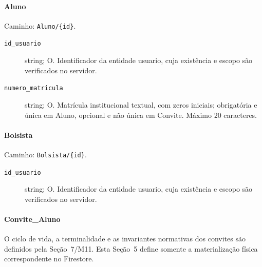 \paragraph{Aluno}\mbox{}\par
Caminho: \texttt{Aluno/\{id\}}.
\begin{description}
\item[\texttt{id\_usuario}] string; O. Identificador da entidade usuario, cuja existência e escopo são verificados no servidor.
\item[\texttt{numero\_matricula}] string; O. Matrícula institucional textual, com zeros iniciais; obrigatória e única em Aluno, opcional e não única em Convite. Máximo 20 caracteres.
\end{description}

\paragraph{Bolsista}\mbox{}\par
Caminho: \texttt{Bolsista/\{id\}}.
\begin{description}
\item[\texttt{id\_usuario}] string; O. Identificador da entidade usuario, cuja existência e escopo são verificados no servidor.
\end{description}

\paragraph{Convite\_Aluno}\mbox{}\par
O ciclo de vida, a terminalidade e as invariantes normativas dos convites são definidos pela Seção~7/M11. Esta Seção~5 define somente a materialização física correspondente no Firestore.

